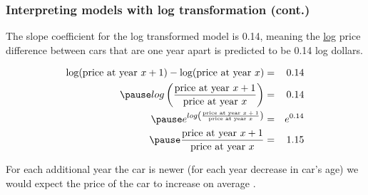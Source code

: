 \documentclass[slidestop,compress,mathserif,12pt,t,professionalfonts,xcolor=table]{beamer}
\begin{document}
\begin{frame}
\frametitle{Interpreting models with log transformation (cont.)}

The slope coefficient for the log transformed model is 0.14, meaning the \underline{log} price difference between cars that are one year apart is predicted to be 0.14 log dollars.

\begin{eqnarray*}
\text{log(price at year $x + 1$)} - \text{log(price at year $x$)} &=& 0.14 \\
\pause
log \pr{ \frac{\text{price at year $x + 1$}}{\text{price at year $x$}} } &=& 0.14 \\
\pause
e^{log \pr{ \frac{\text{price at year $x + 1$}}{\text{price at year $x$}} }} &=& e^{0.14} \\
\pause
\frac{\text{price at year $x + 1$}}{\text{price at year $x$}} &=& 1.15
\end{eqnarray*}

\pause

For each additional year the car is newer (for each year decrease in car's age) we would expect the price of the car to increase on average .

\end{frame}

\end{document}
